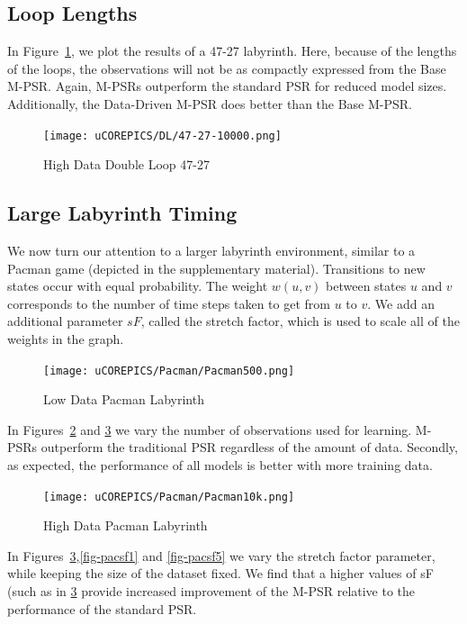 \subsection{Loop Lengths}

In Figure~\ref{fig-dl47}, we plot the results of a 47-27 labyrinth.  Here, because of the lengths of the loops, the observations will not be as compactly expressed from the Base M-PSR. Again, M-PSRs outperform the standard PSR for reduced model sizes. Additionally, the Data-Driven M-PSR does better than the Base M-PSR.

\begin{figure}[ht!]
\centering
\texttt{[image: uCOREPICS/DL/47-27-10000.png]}
\caption{High Data Double Loop 47-27\label{fig-dl47}}
\end{figure}




\subsection{Large Labyrinth Timing}

We now turn our attention to a larger labyrinth environment, similar to a Pacman game (depicted in the supplementary material).  Transitions to new states occur with equal probability. The weight $w(u,v)$ between states $u$ and $v$ corresponds to the number of time steps taken to get from $u$ to $v$. We add an additional parameter $sF$, called the stretch factor, which is used to scale all of the weights in the graph. 


\begin{figure}[ht!]
\centering
\texttt{[image: uCOREPICS/Pacman/Pacman500.png]}
\caption{Low Data Pacman Labyrinth\label{fig-paclow}}
\end{figure}


In Figures~\ref{fig-paclow} and \ref{fig-pachigh} we vary the number of observations used for learning. M-PSRs outperform the traditional PSR regardless of the amount of data. Secondly, as expected, the performance of all models is  better with more training data.
\begin{figure}[ht!]
\centering
\texttt{[image: uCOREPICS/Pacman/Pacman10k.png]}
\caption{High Data Pacman Labyrinth\label{fig-pachigh}}
\end{figure}


In Figures~\ref{fig-pachigh},\ref{fig-pacsf1} and \ref{fig-pacsf5} we vary the stretch factor parameter, while  keeping the size of the dataset fixed. We find that a higher values of sF (such as in \ref{fig-pachigh} provide increased improvement of the M-PSR relative to the performance of the standard PSR.


